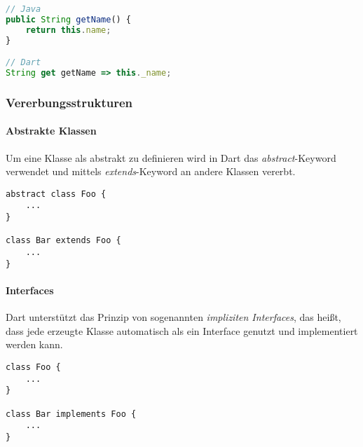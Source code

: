 \begin{lstlisting}[language=JavaScript]
// Java
public String getName() {
    return this.name;
}

// Dart
String get getName => this._name;
\end{lstlisting}

\subsubsection{Vererbungsstrukturen}

\paragraph{Abstrakte Klassen}


Um eine Klasse als abstrakt zu definieren wird in Dart das \textit{abstract}-Keyword verwendet und mittels
\textit{extends}-Keyword an andere Klassen vererbt.

\begin{lstlisting}
abstract class Foo {
    ...
}

class Bar extends Foo {
    ...
}
\end{lstlisting}

\paragraph{Interfaces}
 

Dart unterstützt das Prinzip von sogenannten \textit{impliziten Interfaces}, das heißt, dass jede
erzeugte Klasse automatisch als ein Interface genutzt und implementiert werden kann.

\begin{lstlisting}
class Foo {
    ...
}

class Bar implements Foo {
    ...
}
\end{lstlisting}

